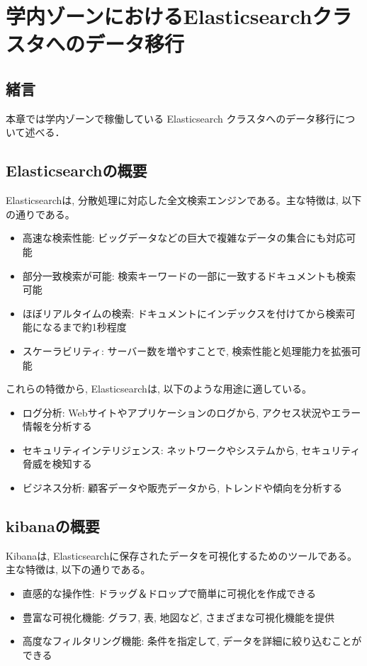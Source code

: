
\chapter{学内ゾーンにおけるElasticsearchクラスタへのデータ移行}
\label{chap:third}

\section{緒言}
本章では学内ゾーンで稼働している Elasticsearch クラスタへのデータ移行について述べる．

\section{Elasticsearchの概要}
Elasticsearchは, 分散処理に対応した全文検索エンジンである。主な特徴は, 以下の通りである。

\begin{itemize}
  \item 高速な検索性能: ビッグデータなどの巨大で複雑なデータの集合にも対応可能
  \item 部分一致検索が可能: 検索キーワードの一部に一致するドキュメントも検索可能
  \item ほぼリアルタイムの検索: ドキュメントにインデックスを付けてから検索可能になるまで約1秒程度
  \item スケーラビリティ: サーバー数を増やすことで, 検索性能と処理能力を拡張可能
\end{itemize}

これらの特徴から, Elasticsearchは, 以下のような用途に適している。

\begin{itemize}
  \item ログ分析: Webサイトやアプリケーションのログから, アクセス状況やエラー情報を分析する
  \item セキュリティインテリジェンス: ネットワークやシステムから, セキュリティ脅威を検知する
  \item ビジネス分析: 顧客データや販売データから, トレンドや傾向を分析する
\end{itemize}

\section{kibanaの概要}

Kibanaは, Elasticsearchに保存されたデータを可視化するためのツールである。主な特徴は, 以下の通りである。

\begin{itemize}
  \item 直感的な操作性: ドラッグ＆ドロップで簡単に可視化を作成できる
  \item 豊富な可視化機能: グラフ, 表, 地図など, さまざまな可視化機能を提供
  \item 高度なフィルタリング機能: 条件を指定して, データを詳細に絞り込むことができる
\end{itemize}

